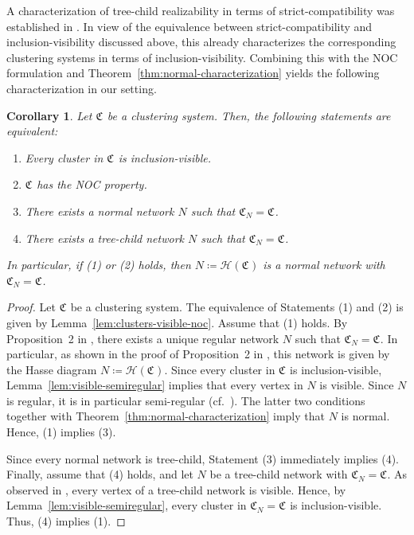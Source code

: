 \documentclass[preprint]{elsarticle}
\newtheorem{corollary}[theorem]{Corollary}
\newcommand{\CS}[1][]{\ensuremath{\mathfrak{C}_{#1}}}
\newcommand{\Hasse}{\ensuremath{\mathcal{H}}}
\begin{document}
A characterization of tree-child realizability in terms of strict-compatibility was established in
\cite[Thm.~4.6]{ALRR:14}. In view of the equivalence between strict-compatibility and
inclusion-visibility discussed above, this already characterizes the corresponding clustering systems
in terms of inclusion-visibility. Combining this with the NOC formulation and
Theorem~\ref{thm:normal-characterization} yields the following characterization in our setting.


\begin{corollary}\label{cor:NOC-char}
    Let $\CS$ be a clustering system. Then, the following statements are equivalent: 
    \begin{enumerate}[(1)]
        \item Every cluster in $\CS$ is inclusion-visible.
        \item $\CS$ has the NOC property.
        \item There exists a normal network $N$ such that $\CS[N]=\CS$.
        \item There exists a tree-child network $N$ such that $\CS[N]=\CS$.
    \end{enumerate}
    In particular, if (1) or (2) holds, then 
   $N\coloneqq\Hasse(\CS)$ is a normal network with $\CS[N]=\CS$.
\end{corollary}
\begin{proof}
  Let $\CS$ be a clustering system. The equivalence of Statements (1) and (2) is given by
  Lemma~\ref{lem:clusters-visible-noc}. Assume that (1) holds. By Proposition~2 in 
  \cite{Hellmuth:2023}, there exists a unique regular network $N$ such that $\CS[N]=\CS$. 
  In particular, as shown in the proof of Proposition~2 in \cite{Hellmuth:2023}, 
  this network is given by the Hasse diagram $N\coloneqq\Hasse(\CS)$. 
  Since every cluster in $\CS$ is inclusion-visible, Lemma~\ref{lem:visible-semiregular} 
  implies that every vertex in $N$ is visible. Since $N$  is regular, it is in particular 
  semi-regular (cf.\ \cite[Thm.~2]{Hellmuth:2023}). The latter two conditions together with 
  Theorem~\ref{thm:normal-characterization} imply that $N$ is normal. Hence, (1) implies (3).
 
  Since every normal network is tree-child, Statement (3) immediately implies (4).
  Finally, assume that (4) holds, and let $N$ be a tree-child network with $\CS[N]=\CS$. As observed
  in \cite[Lem.~2]{Cardona:2009}, every vertex of a tree-child network is visible.  Hence, by
  Lemma~\ref{lem:visible-semiregular}, every cluster in $\CS[N]=\CS$ is inclusion-visible. Thus, (4)
  implies (1).
\end{proof}
\end{document}
